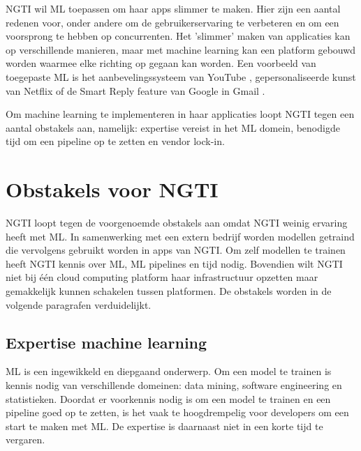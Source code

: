 NGTI wil ML toepassen om haar apps slimmer te maken. Hier zijn een aantal redenen voor, onder andere om de gebruikerservaring te verbeteren en om een voorsprong te hebben op concurrenten. Het 'slimmer' maken van applicaties kan op verschillende manieren, maar met machine learning kan een platform gebouwd worden waarmee elke richting op gegaan kan worden. Een voorbeeld van toegepaste ML is het aanbevelingssysteem van YouTube \cite{youtube-recommendation-system}, gepersonaliseerde kunst van Netflix \cite{netflix-personalized-art} of de Smart Reply feature van Google in Gmail \cite{smart-reply-gmail}.

Om machine learning te implementeren in haar applicaties loopt NGTI tegen een aantal obstakels aan, namelijk: expertise vereist in het ML domein, benodigde tijd om een pipeline op te zetten en vendor lock-in.

\section{Obstakels voor NGTI}\label{sec:ch2-obstakels-voor-ngti}
NGTI loopt tegen de voorgenoemde obstakels aan omdat NGTI weinig ervaring heeft met ML. In samenwerking met een extern bedrijf worden modellen getraind die vervolgens gebruikt worden in apps van NGTI. Om zelf modellen te trainen heeft NGTI kennis over ML, ML pipelines en tijd nodig. Bovendien wilt NGTI niet bij één cloud computing platform haar infrastructuur opzetten maar gemakkelijk kunnen schakelen tussen platformen. De obstakels worden in de volgende paragrafen verduidelijkt.

\subsection{Expertise machine learning}\label{subsec:ch2-expertise-machine-learning}
ML is een ingewikkeld en diepgaand onderwerp. Om een model te trainen is kennis nodig van verschillende domeinen: data mining, software engineering en statistieken. Doordat er voorkennis nodig is om een model te trainen en een pipeline goed op te zetten, is het vaak te hoogdrempelig voor developers om een start te maken met ML. De expertise is daarnaast niet in een korte tijd te vergaren.

